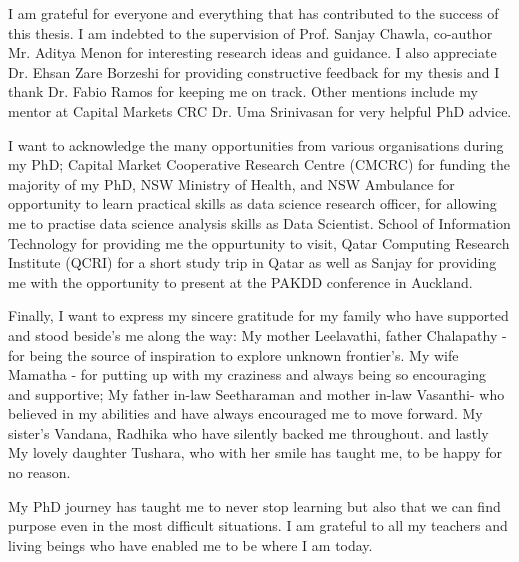 %
%



I am grateful for everyone and everything that has contributed to the success of this thesis.  I am indebted to the supervision of Prof. Sanjay Chawla,   co-author Mr. Aditya Menon  for interesting research ideas and  guidance. I also appreciate Dr. Ehsan Zare Borzeshi  for providing constructive feedback for my thesis and I  thank Dr. Fabio Ramos for keeping me on track. Other mentions include my mentor at Capital Markets CRC Dr. Uma Srinivasan for very helpful PhD advice.


 I want to acknowledge the many opportunities from various organisations during my PhD;
  Capital Market Cooperative Research Centre (CMCRC) for funding the majority of my PhD,   NSW Ministry of Health, and NSW Ambulance for opportunity to learn practical skills as data science research officer, for allowing me to practise data science analysis skills as Data Scientist.  School of Information Technology for providing me the oppurtunity to visit, Qatar Computing Research Institute (QCRI)  for a short study trip in Qatar as well as Sanjay for providing me with the opportunity to present at the PAKDD conference  in Auckland.

Finally, I want to express my sincere gratitude for my family who have supported and stood beside's me along the way:
My mother Leelavathi, father Chalapathy - for being the source of inspiration to explore unknown frontier's.
My wife Mamatha - for putting up with my craziness and always being so encouraging and supportive;
My father in-law Seetharaman and mother in-law  Vasanthi- who believed in my abilities and have always encouraged me to move forward.
My sister's Vandana, Radhika who have silently backed me throughout. and lastly My lovely daughter Tushara, who with her smile has taught me, to be happy for no reason.

My PhD journey has taught me to never stop learning but also that we can find purpose even in the most difficult situations.
I am grateful to all my teachers and living beings who have enabled me to be where I am today.
